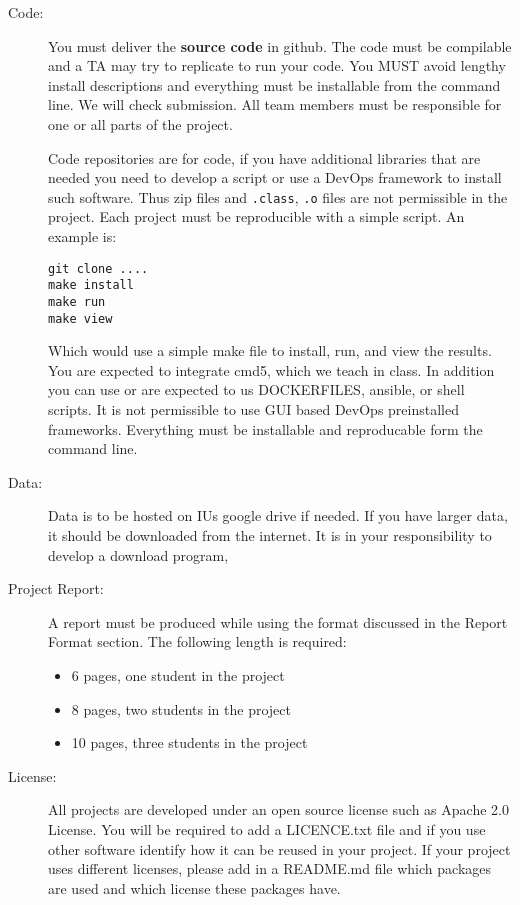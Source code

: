 \begin{description}
\item[Code:]
You must deliver the \textbf{source code} in github. The code must be
compilable and a TA may try to replicate to run your code. You MUST
avoid lengthy install descriptions and everything must be installable
from the command line. We will check submission. All team members must
be responsible for one or all parts of the project.

Code repositories are for code, if you have additional libraries that
are needed you need to develop a script or use a DevOps framework to
install such software. Thus zip files and \verb|.class|, \verb|.o| files are not
permissible in the project. Each project must be reproducible with a
simple script. An example is:

\begin{verbatim}
git clone ....
make install
make run
make view
\end{verbatim}

Which would use a simple make file to install, run, and view the
results.  You are expected to integrate cmd5, which we teach in
class. In addition you can use or are expected to us DOCKERFILES,
ansible, or shell scripts. It is not permissible to use GUI based
DevOps preinstalled frameworks. Everything must be installable and
reproducable form the command line.

\item[Data:] Data is to be hosted on IUs google drive if needed. If
  you have larger data, it should be downloaded from the internet. It
  is in your responsibility to develop a download program,
\item[Project Report:] A report must be produced while using the
  format discussed in the Report Format section. The following length
  is required:

\begin{itemize}
\item
  6 pages, one student in the project
\item
  8 pages, two students in the project
\item
  10 pages, three students in the project
\end{itemize}

\item[License:] All projects are developed under an open source
  license such as Apache 2.0 License. You will be required to add a
  LICENCE.txt file and if you use other software identify how it can
  be reused in your project. If your project uses different licenses,
  please add in a README.md file which packages are used and which
  license these packages have.
\end{description}

